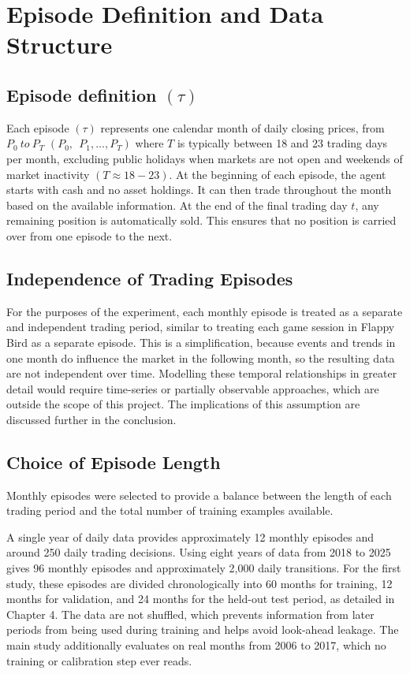 \section{Episode Definition and Data Structure}

\subsection{Episode definition \texorpdfstring{\((\tau)\)}{()}}

Each episode \((\tau)\) represents one calendar month of daily closing
prices, from \(P_{0}\ to\ P_{T}\) \((P_{0},\ \ P_{1},\ldots,P_{T})\)
where \(T\) is typically between 18 and 23 trading days per month,
excluding public holidays when markets are not open and weekends of
market inactivity \((T \approx 18 - 23)\). At the beginning of each
episode, the agent starts with cash and no asset holdings. It can then
trade throughout the month based on the available information. At the
end of the final trading day \(t\), any remaining position is
automatically sold. This ensures that no position is carried over from
one episode to the next.

\subsection{Independence of Trading Episodes}

For the purposes of the experiment, each monthly episode is treated as a
separate and independent trading period, similar to treating each game
session in Flappy Bird as a separate episode. This is a simplification,
because events and trends in one month do influence the market in the
following month, so the resulting data are not independent over time.
Modelling these temporal relationships in greater detail would require
time-series or partially observable approaches, which are outside the
scope of this project. The implications of this assumption are discussed
further in the conclusion.

\subsection{Choice of Episode Length}

Monthly episodes were selected to provide a balance between the length
of each trading period and the total number of training examples
available.

A single year of daily data provides approximately 12 monthly episodes
and around 250 daily trading decisions. Using eight years of data from
2018 to 2025 gives 96 monthly episodes and approximately 2,000 daily
transitions. For the first study, these episodes are divided
chronologically into 60 months for training, 12 months for validation,
and 24 months for the held-out test period, as detailed in Chapter 4.
The data are not shuffled, which prevents information from later periods
from being used during training and helps avoid look-ahead leakage. The
main study additionally evaluates on real months from 2006 to 2017,
which no training or calibration step ever reads.

